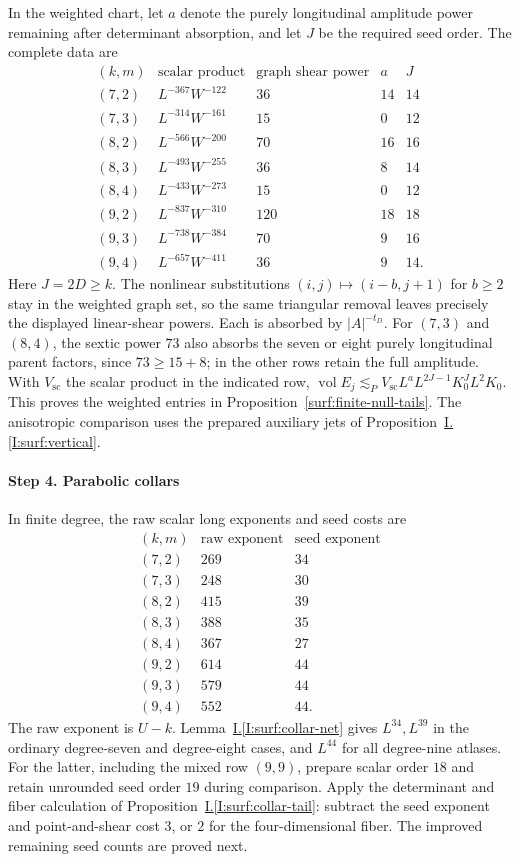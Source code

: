 \documentclass[11pt]{amsart}
\theoremstyle{definition}
\theoremstyle{remark}
\numberwithin{equation}{section}
\newcommand{\partIref}[1]{\hyperref[I:#1]{I.\ref*{I:#1}}}
\begin{document}
In the weighted chart, let $a$ denote the purely longitudinal amplitude power remaining after determinant absorption, and let $J$ be the required seed order. The complete data are
\[
\begin{array}{c|c|r|r|r}
(k,m)&\text{scalar product}&\text{graph shear power}&a&J\\\hline
(7,2)&L^{-367}W^{-122}&36&14&14\\
(7,3)&L^{-314}W^{-161}&15&0&12\\
(8,2)&L^{-566}W^{-200}&70&16&16\\
(8,3)&L^{-493}W^{-255}&36&8&14\\
(8,4)&L^{-433}W^{-273}&15&0&12\\
(9,2)&L^{-837}W^{-310}&120&18&18\\
(9,3)&L^{-738}W^{-384}&70&9&16\\
(9,4)&L^{-657}W^{-411}&36&9&14.
\end{array}
\]
Here $J=2D\ge k$. The nonlinear substitutions $(i,j)\mapsto(i-b,j+1)$ for $b\ge2$ stay in the weighted graph set, so the same triangular removal leaves precisely the displayed linear-shear powers. Each is absorbed by $|A|^{-t_D}$. For $(7,3)$ and $(8,4)$, the sextic power $73$ also absorbs the seven or eight purely longitudinal parent factors, since $73\ge15+8$; in the other rows retain the full amplitude. With $V_{\mathrm{sc}}$ the scalar product in the indicated row, $\operatorname{vol}E_j\lesssim_P V_{\mathrm{sc}}L^aL^{2J-1}K_0^JL^2K_0$. This proves the weighted entries in Proposition~\ref{surf:finite-null-tails}. The anisotropic comparison uses the prepared auxiliary jets of Proposition~\partIref{surf:vertical}.

\paragraph{Step 4. Parabolic collars}

In finite degree, the raw scalar long exponents and seed costs are
\[
\begin{array}{c|r|r}
(k,m)&\text{raw exponent}&\text{seed exponent}\\\hline
(7,2)&269&34\\
(7,3)&248&30\\
(8,2)&415&39\\
(8,3)&388&35\\
(8,4)&367&27\\
(9,2)&614&44\\
(9,3)&579&44\\
(9,4)&552&44.
\end{array}
\]
The raw exponent is $U-k$. Lemma~\partIref{surf:collar-net} gives $L^{34},L^{39}$ in the ordinary degree-seven and degree-eight cases, and $L^{44}$ for all degree-nine atlases. For the latter, including the mixed row $(9,9)$, prepare scalar order $18$ and retain unrounded seed order $19$ during comparison. Apply the determinant and fiber calculation of Proposition~\partIref{surf:collar-tail}: subtract the seed exponent and point-and-shear cost $3$, or $2$ for the four-dimensional fiber. The improved remaining seed counts are proved next.
\end{document}
